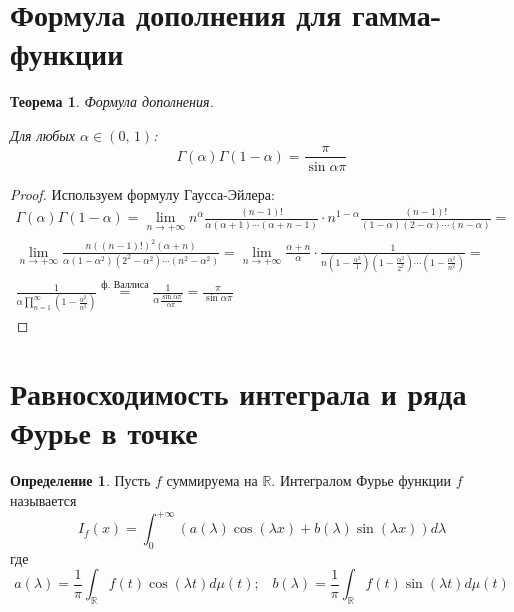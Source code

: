 \documentclass[a4paper,12pt]{article}
\theoremstyle{plain}
\newtheorem{theorem}{Теорема}[section]
\theoremstyle{definition}
\newtheorem{definition}{Определение}[section]
\theoremstyle{remark}
\begin{document}
\section{Формула дополнения для гамма-функции}
\begin{theorem}
	Формула дополнения.

	Для любых $\alpha \in (0,\,1)$:
	\[\Gamma(\alpha)\Gamma(1 - \alpha) = \frac{\pi}{\sin\alpha\pi}\]
\end{theorem}
\begin{proof}
	Используем формулу Гаусса-Эйлера:
	\begin{align*}
		\Gamma(\alpha)\Gamma(1 - \alpha) = \lim_{n \to +\infty} n^\alpha\frac{(n - 1)!}{\alpha(\alpha + 1)\cdots(\alpha + n - 1)}\cdot n^{1 - \alpha}\frac{(n - 1)!}{(1 - \alpha)(2 - \alpha)\cdots(n - \alpha)} =                                                           \\
		\lim_{n \to +\infty}\frac{n((n - 1)!)^2(\alpha + n)}{\alpha(1 - \alpha^2)(2^2 - \alpha^2)\cdots(n^2 - \alpha^2)} = \lim_{n \to +\infty}\frac{\alpha + n}{\alpha}\cdot\frac{1}{n(1 - \frac{\alpha^2}{1})(1 - \frac{\alpha^2}{2^2})\cdots(1 - \frac{\alpha^2}{n^2})} = \\
		\frac{1}{\alpha\prod_{n = 1}^\infty\left(1 - \frac{\alpha^2}{n^2}\right)}\stackrel{\text{ф. Валлиса}}{=} \frac{1}{\alpha\frac{\sin\alpha\pi}{\alpha\pi}} = \frac{\pi}{\sin\alpha\pi}
	\end{align*}
\end{proof}

\section{Равносходимость интеграла и ряда Фурье в точке}
\begin{definition}
	Пусть $f$ суммируема на $\mathbb{R}$. Интегралом Фурье функции $f$ называется
	\[I_f(x) = \int_0^{+\infty}(a(\lambda)\cos(\lambda x) + b(\lambda)\sin(\lambda x))d\lambda\]
	где
	\[a(\lambda) = \frac{1}{\pi}\int_\mathbb{R}f(t)\cos(\lambda t)d\mu(t);\;\;\; b(\lambda) = \frac{1}{\pi}\int_\mathbb{R} f(t)\sin(\lambda t)d\mu(t)\]
\end{definition}
\end{document}
